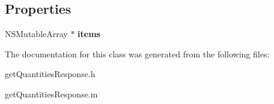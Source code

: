 \subsection*{Properties}
\begin{DoxyCompactItemize}
\item 
\hypertarget{interfaceget_quantities_response_a44443a820bf05a4d34a47d967152d601}{}N\+S\+Mutable\+Array $\ast$ {\bfseries items}\label{interfaceget_quantities_response_a44443a820bf05a4d34a47d967152d601}

\end{DoxyCompactItemize}


The documentation for this class was generated from the following files\+:\begin{DoxyCompactItemize}
\item 
get\+Quantities\+Response.\+h\item 
get\+Quantities\+Response.\+m\end{DoxyCompactItemize}

